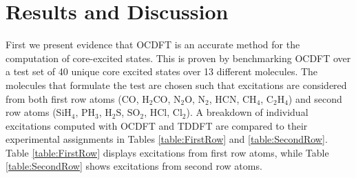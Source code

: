 \documentclass[12pt]{article}
\begin{document}
\section{Results and Discussion}
First we present evidence that OCDFT is an accurate method for the computation of core-excited states. This is proven by benchmarking OCDFT over a test set of 40 unique core excited states over 13 different molecules.
The molecules that formulate the test are chosen such that excitations are considered from both first row atoms (CO, H$_2$CO, N$_2$O, N$_2$, HCN, CH$_4$, C$_2$H$_4$) and second row atoms (SiH$_4$, PH$_3$, H$_2$S, SO$_2$, HCl, Cl$_2$). A breakdown of individual excitations computed with OCDFT and TDDFT are compared to their experimental assignments in Tables \ref{table:FirstRow} and \ref{table:SecondRow}. Table \ref{table:FirstRow} displays excitations from first row atoms, while Table \ref{table:SecondRow} shows excitations from second row atoms.
\end{document}
